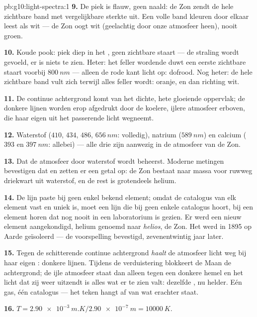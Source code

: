 \begin{solution}{pb:g10:light-spectra:1}
\textbf{9.} De piek is flauw, geen naald: de Zon zendt de hele zichtbare
band met vergelijkbare sterkte uit. Een volle band kleuren door elkaar
leest als wit --- de Zon oogt wit (geelachtig door onze atmosfeer heen),
nooit groen.

\textbf{10.} Koude pook: piek diep in het , geen zichtbare
staart --- de straling wordt gevoeld, er is niets te zien. Heter: het
feller wordende  duwt een eerste zichtbare staart voorbij
$\qty{800}{nm}$ --- alleen de rode kant licht op: dofrood. Nog heter: de
hele zichtbare band vult zich terwijl alles feller wordt: oranje, en dan
richting wit.

\textbf{11.} De continue achtergrond komt van het dichte, hete gloeiende
oppervlak; de donkere lijnen worden erop afgedrukt door de koelere,
ijlere atmosfeer erboven, die haar eigen  uit het passerende
licht wegneemt.

\textbf{12.} Waterstof ($410$, $434$, $486$, $\qty{656}{nm}$: volledig),
natrium ($\qty{589}{nm}$) en calcium ($393$ en $\qty{397}{nm}$: allebei)
--- alle drie zijn aanwezig in de atmosfeer van de Zon.

\textbf{13.} Dat de atmosfeer door waterstof wordt beheerst. Moderne
metingen bevestigen dat en zetten er een getal op: de Zon bestaat naar
massa voor ruwweg driekwart uit waterstof, en de rest is grotendeels
helium.

\textbf{14.} De lijn paste bij geen enkel bekend element; omdat de
catalogus van elk element vast en uniek is, moet een lijn die bij geen
enkele catalogus hoort, bij een element horen dat nog nooit in een
laboratorium is gezien. Er werd een nieuw element aangekondigd, helium
genoemd naar \emph{helios}, de Zon. Het werd in 1895 op Aarde
geïsoleerd --- de voorspelling bevestigd, zevenentwintig jaar later.

\textbf{15.} Tegen de schitterende continue achtergrond \emph{haalt} de
atmosfeer licht weg bij haar eigen : donkere lijnen. Tijdens
de verduistering blokkeert de Maan de achtergrond; de ijle atmosfeer
staat dan alleen tegen een donkere hemel en het licht dat zij weer
uitzendt is alles wat er te zien valt: dezelfde , nu helder.
Eén gas, één catalogus --- het teken hangt af van wat erachter staat.

\textbf{16.} $T = \qty{2.90e-3}{m.K} / \qty{2.90e-7}{m}
= \qty{10000}{K}$.


\end{solution}
